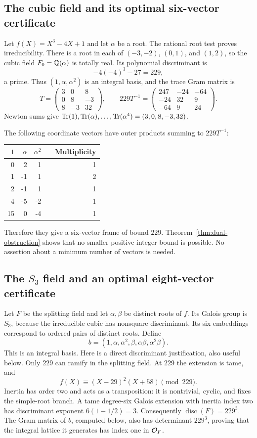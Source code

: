 \subsection{The cubic field and its optimal six-vector certificate}

Let $f(X)=X^3-4X+1$ and let $\alpha$ be a root. The rational root test proves irreducibility. There is a root in each of $(-3,-2)$, $(0,1)$, and $(1,2)$, so the cubic field $F_0=\mathbb Q(\alpha)$ is totally real. Its polynomial discriminant is
\[
 -4(-4)^3-27=229,
\]
a prime. Thus $(1,\alpha,\alpha^2)$ is an integral basis, and the trace Gram matrix is
\[
 T=\begin{pmatrix}3&0&8\\0&8&-3\\8&-3&32\end{pmatrix},
 \qquad
 229T^{-1}=\begin{pmatrix}247&-24&-64\\-24&32&9\\-64&9&24\end{pmatrix}.
\]
Newton sums give $\operatorname{Tr}(1),\operatorname{Tr}(\alpha),\ldots,\operatorname{Tr}(\alpha^4)=(3,0,8,-3,32)$.

The following coordinate vectors have outer products summing to $229T^{-1}$:
\begin{center}
\begin{tabular}{@{}rrrcr@{}}
\toprule
$1$&$\alpha$&$\alpha^2$&&Multiplicity\\\midrule
0&2&1&&1\\
1&-1&1&&2\\
2&-1&1&&1\\
4&-5&-2&&1\\
15&0&-4&&1\\\bottomrule
\end{tabular}
\end{center}
Therefore they give a six-vector frame of bound $229$. Theorem~\ref{thm:dual-obstruction} shows that no smaller positive integer bound is possible. No assertion about a minimum number of vectors is needed.

\subsection{The $S_3$ field and an optimal eight-vector certificate}

Let $F$ be the splitting field and let $\alpha,\beta$ be distinct roots of $f$. Its Galois group is $S_3$, because the irreducible cubic has nonsquare discriminant. Its six embeddings correspond to ordered pairs of distinct roots. Define
\[
 b=(1,\alpha,\alpha^2,\beta,\alpha\beta,\alpha^2\beta).
\]
This is an integral basis. Here is a direct discriminant justification, also useful below. Only $229$ can ramify in the splitting field. At $229$ the extension is tame, and
\[
 f(X)\equiv(X-29)^2(X+58)\pmod{229}.
\]
Inertia has order two and acts as a transposition: it is nontrivial, cyclic, and fixes the simple-root branch. A tame degree-six Galois extension with inertia index two has discriminant exponent $6(1-1/2)=3$. Consequently $\operatorname{disc}(F)=229^3$. The Gram matrix of $b$, computed below, also has determinant $229^3$, proving that the integral lattice it generates has index one in $\mathcal O_F$.

